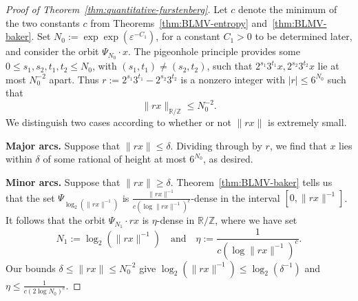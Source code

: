 \documentclass[11pt]{amsart}
\theoremstyle{definition}
\newcommand{\R}{{\mathbb R}}
\newcommand{\Z}{{\mathbb Z}}
\begin{document}
\begin{proof}[Proof of Theorem~\ref{thm:quantitative-furstenberg}]
Let $c$ denote the minimum of the two constants $c$ from Theorems~\ref{thm:BLMV-entropy} and~\ref{thm:BLMV-baker}.  Set $N_0:=\exp\exp(\varepsilon^{-C_1})$, for a constant $C_1>0$ to be determined later, and consider the orbit $\Psi_{N_0} \cdot x$.  The pigeonhole principle provides some $0 \leq s_1,s_2,t_1,t_2 \leq N_0$, with $(s_1,t_1) \neq (s_2,t_2)$, such that $2^{s_1} 3^{t_1} x,2^{s_2}3^{t_2}x$ lie at most $N_0^{-2}$ apart.  Thus $r:=2^{s_1} 3^{t_1} -2^{s_2}3^{t_2}$ is a nonzero integer with $|r| \leq 6^{N_0}$ such that
$$\|rx\|_{\mathbb{R}/\mathbb{Z}} \leq N_0^{-2}.$$
We distinguish two cases according to whether or not $\|rx\|$ is extremely small.

{\bf Major arcs.} Suppose that $\|rx\| \leq \delta$.  Dividing through by $r$, we find that $x$ lies within $\delta$ of some rational of height at most $6^{N_0}$, as desired.

{\bf Minor arcs.} Suppose that $\|rx\| \geq \delta$.  Theorem~\ref{thm:BLMV-baker} tells us that the set $\Psi_{\log_2(\|rx\|^{-1})}$ is $\frac{\|rx\|^{-1}}{c(\log \|rx\|^{-1})^c}$-dense in the interval $[0,\|rx\|^{-1}]$.  It follows that the orbit $\Psi_{N_1} \cdot rx$ is $\eta$-dense in $\R/\Z$, where we have set $$N_1:=\log_2(\|rx\|^{-1}) \quad \text{and} \quad \eta:=\frac{1}{c(\log \|rx\|^{-1})^c}.$$  Our bounds $\delta \leq \|rx\| \leq N_0^{-2}$ give $\log_2(\|rx\|^{-1}) \leq \log_2(\delta^{-1})$ and $\eta \leq \frac{1}{c(2 \log N_0)^c}$.



\end{proof}
\end{document}
